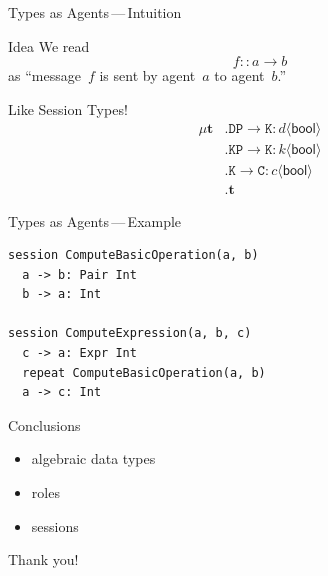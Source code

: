 \documentclass{beamer}
\begin{document}
\begin{frame}[fragile]{Types as Agents\,---\,Intuition}
\begin{block}{Idea}
We read \[f :: a \to b\] as
``message~$f$ is sent by agent~$a$ to agent~$b$.''
\end{block}
\begin{block}{Like Session Types!}
\begin{align*}
\mu\mathbf{t}&.\mathtt{DP}\to\mathtt{K}:d\langle\mathsf{bool}\rangle \\
  &.\mathtt{KP}\to\mathtt{K}:k\langle\mathsf{bool}\rangle\\
  &.\mathtt{K}\to\mathtt{C}:c\langle\mathsf{bool}\rangle\\
  &.\mathbf{t}
\end{align*}
\end{block}
\end{frame}

\begin{frame}[fragile]{Types as Agents\,---\,Example}
\begin{lstlisting}
session ComputeBasicOperation(a, b)
  a -> b: Pair Int
  b -> a: Int

session ComputeExpression(a, b, c)
  c -> a: Expr Int
  repeat ComputeBasicOperation(a, b)
  a -> c: Int
\end{lstlisting}
\end{frame}

\begin{frame}{Conclusions}
\begin{itemize}
\item \alert{algebraic data types}
\item roles
\item sessions
\end{itemize}
\end{frame}

\begin{frame}
\centerline{Thank you!}
\end{frame}
\end{document}
